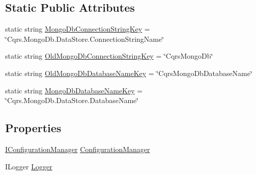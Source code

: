 \subsection*{Static Public Attributes}
\begin{DoxyCompactItemize}
\item 
static string \hyperlink{classCqrs_1_1Mongo_1_1Factories_1_1MongoDataStoreConnectionStringFactory_a3740f3d23c33cc85377d4c9073f61c97_a3740f3d23c33cc85377d4c9073f61c97}{Mongo\+Db\+Connection\+String\+Key} = \char`\"{}Cqrs.\+Mongo\+Db.\+Data\+Store.\+Connection\+String\+Name\char`\"{}
\item 
static string \hyperlink{classCqrs_1_1Mongo_1_1Factories_1_1MongoDataStoreConnectionStringFactory_a345dadeafc614f93f0c5fdbf59684334_a345dadeafc614f93f0c5fdbf59684334}{Old\+Mongo\+Db\+Connection\+String\+Key} = \char`\"{}Cqrs\+Mongo\+Db\char`\"{}
\item 
static string \hyperlink{classCqrs_1_1Mongo_1_1Factories_1_1MongoDataStoreConnectionStringFactory_a7f475a5348f6efc64d595527dd27c246_a7f475a5348f6efc64d595527dd27c246}{Old\+Mongo\+Db\+Database\+Name\+Key} = \char`\"{}Cqrs\+Mongo\+Db\+Database\+Name\char`\"{}
\item 
static string \hyperlink{classCqrs_1_1Mongo_1_1Factories_1_1MongoDataStoreConnectionStringFactory_afeca0c0e92ca9d9c83f15b2b03f769a8_afeca0c0e92ca9d9c83f15b2b03f769a8}{Mongo\+Db\+Database\+Name\+Key} = \char`\"{}Cqrs.\+Mongo\+Db.\+Data\+Store.\+Database\+Name\char`\"{}
\end{DoxyCompactItemize}
\subsection*{Properties}
\begin{DoxyCompactItemize}
\item 
\hyperlink{interfaceCqrs_1_1Configuration_1_1IConfigurationManager}{I\+Configuration\+Manager} \hyperlink{classCqrs_1_1Mongo_1_1Factories_1_1MongoDataStoreConnectionStringFactory_a8bedb4433addd1adc1a20ee38893686d_a8bedb4433addd1adc1a20ee38893686d}{Configuration\+Manager}
\item 
I\+Logger \hyperlink{classCqrs_1_1Mongo_1_1Factories_1_1MongoDataStoreConnectionStringFactory_acc607022a5ff77a44aa7987cab70672a_acc607022a5ff77a44aa7987cab70672a}{Logger}
\end{DoxyCompactItemize}


